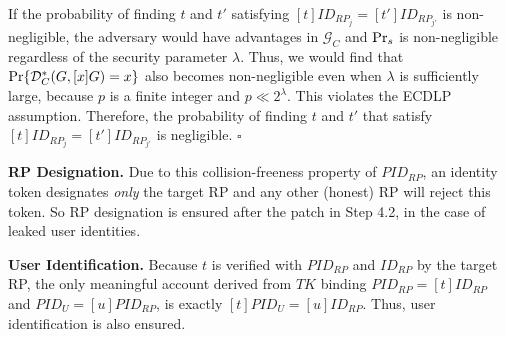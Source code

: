 If the probability of finding $t$ and $t'$ satisfying $[t]ID_{RP_j} = [t']ID_{RP_{j'}}$ is non-negligible, the adversary would have advantages  in $\mathcal{G}_C$ and ${\rm Pr}_s$ is non-negligible regardless of the security parameter $\lambda$.
Thus, we would find that ${\rm Pr}\{\mathcal{D}^*_C(G, [x]G)=x\}$ also becomes non-negligible even when $\lambda$ is sufficiently large, because $p$ is a finite integer and $p \ll 2^\lambda$.
This violates the ECDLP assumption. Therefore, the probability of finding $t$ and $t'$ that satisfy $[t]ID_{RP_j} = [t']ID_{RP_{j'}}$ is negligible.
\hfill $\square$
\vspace{.6mm}

\noindent \textbf{RP Designation.} 
Due to this collision-freeness property of $PID_{RP}$,
    an identity token designates \emph{only} the target RP and any other (honest) RP will reject this token.
So RP designation is ensured after the patch in Step 4.2, in the case of leaked user identities.

\noindent \textbf{User Identification.} 
Because $t$ is verified with $PID_{RP}$ and $ID_{RP}$ by the target RP,
 the only meaningful account derived
from $TK$ binding $PID_{RP}=[t]ID_{RP}$ and $PID_U = [u]PID_{RP}$,
 is exactly $[t]PID_U =[u]ID_{RP}$. Thus, user identification is also ensured.

